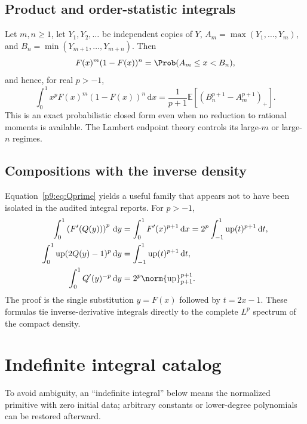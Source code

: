 \documentclass[11pt,oneside]{article}
\theoremstyle{definition}
\theoremstyle{remark}
\newcommand{\Up}{\operatorname{up}}
\newcommand{\E}{\mathbb E}
\newcommand{\dd}{\,\mathrm d}
\newcommand{\1}{\mathbf 1}
\begin{document}
\subsection{Product and order-statistic integrals}

Let $m,n\ge1$, let $Y_1,Y_2,\ldots$ be independent copies of $Y$,
$A_m=\max(Y_1,\ldots,Y_m)$, and
$B_n=\min(Y_{m+1},\ldots,Y_{m+n})$.  Then
\begin{equation}
 F(x)^m(1-F(x))^n
 =\Prob(A_m\le x<B_n),
 \label{p9:eq:order-gap-pointwise}
\end{equation}
and hence, for real $p>-1$,
\begin{equation}
 \int_0^1x^pF(x)^m(1-F(x))^n\dd x
 =\frac1{p+1}\E\left[(B_n^{p+1}-A_m^{p+1})_+\right].
 \label{p9:eq:order-gap-integral}
\end{equation}
This is an exact probabilistic closed form even when no reduction to rational
moments is available.  The Lambert endpoint theory controls its large-$m$ or
large-$n$ regimes.

\subsection{Compositions with the inverse density}

Equation~\ref{p9:eq:Qprime} yields a useful family that appears not to have been
isolated in the audited integral reports.  For $p>-1$,
\begin{align}
 \int_0^1\left(F'(Q(y))\right)^p\dd y
 &=\int_0^1F'(x)^{p+1}\dd x
 =2^p\int_{-1}^1\Up(t)^{p+1}\dd t,
 \label{p9:eq:inverse-density-composition}\\
 \int_0^1\Up(2Q(y)-1)^p\dd y
 &=\int_{-1}^1\Up(t)^{p+1}\dd t,
 \label{p9:eq:up-quantile-composition}\\
 \int_0^1Q'(y)^{-p}\dd y
 &=2^p\norm{\Up}_{p+1}^{p+1}.
 \label{p9:eq:Qprime-negative-power}
\end{align}
The proof is the single substitution $y=F(x)$ followed by $t=2x-1$.
These formulas tie inverse-derivative integrals directly to the complete
$L^p$ spectrum of the compact density.

\section{Indefinite integral catalog}
\label{p9:sec:indefinite-catalog}

To avoid ambiguity, an ``indefinite integral'' below means the normalized
primitive with zero initial data; arbitrary constants or lower-degree
polynomials can be restored afterward.
\end{document}
